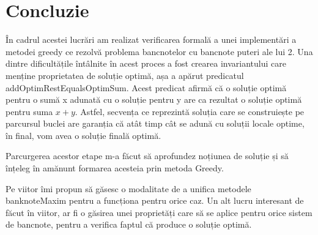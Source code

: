 \chapter*{Concluzie} 

În cadrul acestei lucrări am realizat verificarea formală a unei implementări a metodei greedy ce rezolvă problema 
bancnotelor cu bancnote puteri ale lui 2.
Una dintre dificultățile întâlnite în acest proces a fost crearea invariantului care menține proprietatea de soluție
optimă, așa a apărut predicatul addOptimRestEqualsOptimSum.
Acest predicat afirmă că o soluție optimă pentru o sumă x adunată cu o soluție pentru y are ca rezultat o soluție optimă 
pentru suma $x+y$. Astfel, secvența ce reprezintă soluția care se construiește pe parcursul buclei are garanția că 
atât timp cât se adună cu soluții locale optime, în final, vom avea o soluție finală optimă.\par
Parcurgerea acestor etape m-a făcut să aprofundez noțiunea de soluție și să înțeleg în amănunt formarea acesteia prin
metoda Greedy.\par
Pe viitor îmi propun să găsesc o modalitate de a unifica metodele banknoteMaxim pentru a funcționa pentru orice caz.
Un alt lucru interesant de făcut în viitor, ar fi o găsirea unei proprietăți care să se aplice pentru orice sistem 
de bancnote, pentru a verifica faptul că produce o soluție optimă.
 